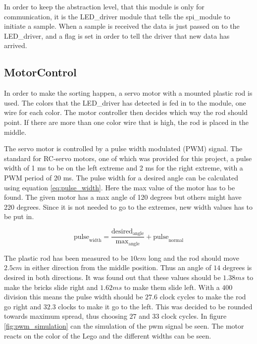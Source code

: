 In order to keep the abstraction level, that this module is only for communication, it is the {LED\_driver} module that tells the {spi\_module} to initiate a sample. When a sample is received the data is just passed on to the LED\_driver, and a flag is set in order to tell the driver that new data has arrived.

\subsection{MotorControl}
In order to make the sorting happen, a servo motor with a mounted plastic rod is used. The colors that the {LED\_driver} has detected is fed in to the module, one wire for each color. The motor controller then decides which way the rod should point. If there are more than one color wire that is high, the rod is placed in the middle. 

The servo motor is controlled by a pulse width modulated (PWM) signal. The standard for RC-servo motors\cite[p. 917]{book:prac_ele}, one of which was provided for this project, a pulse width of 1 ms to be on the left extreme and 2 ms for the right extreme, with a PWM period of 20 ms. 
The pulse width for a desired angle can be calculated using equation \ref{eq:pulse_width}.
Here the max value of the motor has to be found.
The given motor has a max angle of 120 degrees but others might have 220 degrees.
Since it is not needed to go to the extremes, new width values has to be put in. 

\begin{equation}
 \text{pulse}_\text{width} = \frac{\text{desired}_{\text{angle}}}{\text{max}_{\text{angle}}}+\text{pulse}_{\text{normal}} \label{eq:pulse_width}
\end{equation}

The plastic rod has been measured to be $10 cm$ long and the rod should move $2.5 cm$ in either direction from the middle position.
Thus an angle of $14$ degrees is desired in both directions.
It was found out that these values should be $1.38 ms$ to make the bricks slide right and $1.62 ms$ to make them slide left.
With a $400$ division this means the pulse width should be $27.6$ clock cycles to make the rod go right and $32.3$ clocks to make it go to the left.
This was decided to be rounded towards maximum spread, thus choosing $27$ and $33$ clock cycles.
In figure \ref{fig:pwm_simulation} can the simulation of the pwm signal be seen.
The motor reacts on the color of the Lego and the different widths can be seen.

